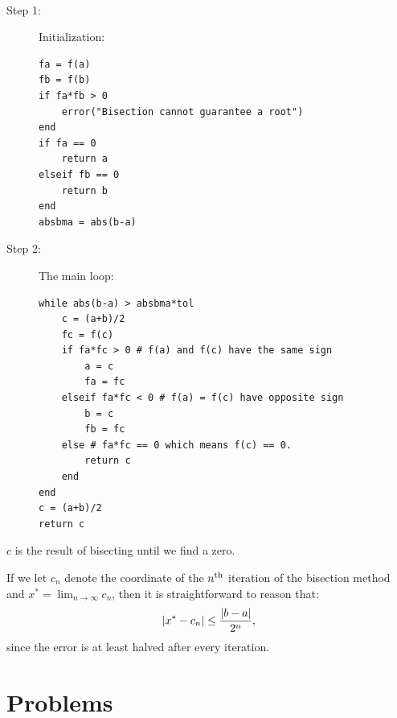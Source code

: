 \begin{algorithm}[Bisection]~\\
\begin{description}
\item[Step 1:] Initialization:
\begin{verbatim}
fa = f(a)
fb = f(b)
if fa*fb > 0
    error("Bisection cannot guarantee a root")
end
if fa == 0
    return a
elseif fb == 0
    return b
end
absbma = abs(b-a)
\end{verbatim}
\item[Step 2:] The main loop:
\begin{verbatim}
while abs(b-a) > absbma*tol
    c = (a+b)/2
    fc = f(c)
    if fa*fc > 0 # f(a) and f(c) have the same sign
        a = c
        fa = fc
    elseif fa*fc < 0 # f(a) = f(c) have opposite sign
        b = c
        fb = fc
    else # fa*fc == 0 which means f(c) == 0.
    	return c
    end
end
c = (a+b)/2
return c
\end{verbatim}
\end{description}
$c$ is the result of bisecting until we find a zero.
\end{algorithm}

If we let $c_n$ denote the coordinate of the $n^{\rm th}$ iteration of the bisection method and $\displaystyle x^* = \lim_{n\to\infty} c_n$, then it is straightforward to reason that:
\begin{equation}\label{eq:bisectionerror}
\left|{x^* - c_n}\right| \le \frac{\left|{b-a}\right|}{2^n},
\end{equation}
since the error is at least halved after every iteration.

\section{Problems}

